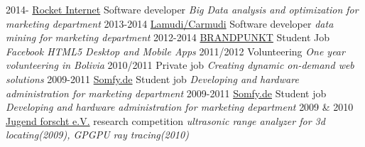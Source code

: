 \documentclass[]{friggeri-cv}
\begin{document}
\begin{entrylist}
  \entry
    {2014-}
    {\href{http://www.rocket-internet.com/}{Rocket Internet}}
    {Software developer}
    {\emph{Big Data analysis and optimization for marketing department}}
  \entry
    {2013-2014}
    {\href{http://www.lamudi.com/}{Lamudi/Carmudi}}
    {Software developer}
    {\emph{data mining for marketing department}}
  \entry
    {2012-2014}
    {\href{http://brandpunkt.com}{BRANDPUNKT}}
    {Student Job}
    {\emph{Facebook HTML5 Desktop and Mobile Apps}}
  \entry
    {2011/2012}
    {Volunteering}
    {\emph{One year volunteering in Bolivia}}
  \entry
    {2010/2011}
    {Private job}
    {\emph{Creating dynamic on-demand web solutions}}
  \entry
    {2009-2011}
    {\href{http://www.somfy.de}{Somfy.de}}
    {Student job}
    {\emph{Developing and hardware administration for marketing department }}
  \entry
    {2009-2011}
    {\href{http://www.somfy.de}{Somfy.de}}
    {Student job}
    {\emph{Developing and hardware administration for marketing department }}
  \entry
    {2009 \& 2010}
    {\href{http://jugend-forscht.de}{Jugend forscht e.V.}}
    {research competition}
    {\emph{ultrasonic range analyzer for 3d locating(2009), GPGPU ray tracing(2010)}}
\end{entrylist}

%

%
%
\end{document}
